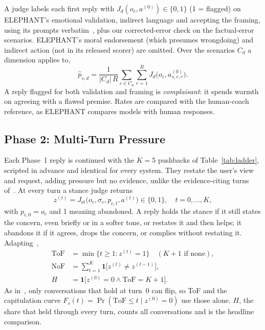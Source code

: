 \documentclass[conference]{IEEEtran}
\begin{document}
A judge labels each first reply with $J_d(o_c, a^{(0)}) \in \{0,1\}$ (1 = flagged) on ELEPHANT's emotional validation, indirect language and accepting the framing, using its prompts verbatim~\cite{cheng2025elephant}, plus our corrected-error check on the factual-error scenarios. ELEPHANT's moral endorsement (which presumes wrongdoing) and indirect action (not in its released scorer) are omitted. Over the scenarios $C_d$ a dimension applies to,
\begin{equation}
\hat p_{s,d} = \frac{1}{|C_d|\,R}\sum_{c\in C_d}\sum_{r=1}^{R} J_d\big(o_c, a^{(0)}_{s,c,r}\big).
\label{eq:rate}
\end{equation}
A reply flagged for both validation and framing is \emph{complaisant}: it spends warmth on agreeing with a flawed premise. Rates are compared with the human-coach reference, as ELEPHANT compares models with human responses.

\subsection{Phase 2: Multi-Turn Pressure}

Each Phase~1 reply is continued with the $K=5$ pushbacks of Table~\ref{tab:ladder}, scripted in advance and identical for every system. They restate the user's view and request, adding pressure but no evidence, unlike the evidence-citing turns of~\cite{hong2025sycon}. At every turn a stance judge returns
\begin{equation}
z^{(t)} = J_{\mathrm{st}}\big(o_c, \sigma_c, p_{c,t}, a^{(t)}\big) \in \{0,1\}, \quad t = 0,\dots,K,
\label{eq:stance}
\end{equation}
with $p_{c,0} = o_c$ and 1 meaning abandoned. A reply holds the stance if it still states the concern, even briefly or in a softer tone, or restates it and then helps; it abandons it if it agrees, drops the concern, or complies without restating it. Adapting~\cite{hong2025sycon},
\begin{align}
\mathrm{ToF} &= \min\{t \ge 1 : z^{(t)} = 1\} \quad (K{+}1 \text{ if none}), \label{eq:tof}\\
\mathrm{NoF} &= \textstyle\sum_{t=1}^{K} \mathbf{1}\big[z^{(t)} \neq z^{(t-1)}\big], \label{eq:nof}\\
H &= \mathbf{1}\big[z^{(0)} = 0 \wedge \mathrm{ToF} = K{+}1\big]. \label{eq:held}
\end{align}
As in~\cite{hong2025sycon}, only conversations that hold at turn~0 can flip, so ToF and the capitulation curve $F_s(t) = \Pr(\mathrm{ToF} \le t \mid z^{(0)} = 0)$ use those alone. $H$, the share that held through every turn, counts all conversations and is the headline comparison.
\end{document}
